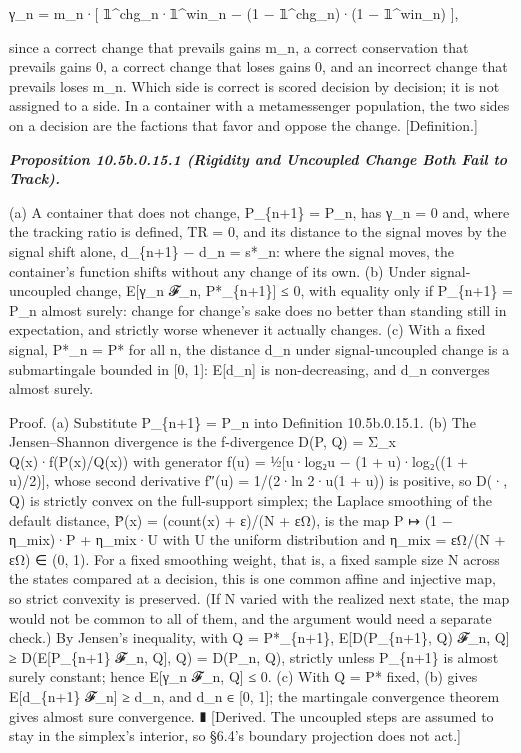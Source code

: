 \documentclass[
]{article}
\begin{document}
γ\_n = m\_n·{[} 𝟙\^{}chg\_n·𝟙\^{}win\_n − (1 − 𝟙\^{}chg\_n)·(1 −
𝟙\^{}win\_n) {]},

since a correct change that prevails gains m\_n, a correct conservation
that prevails gains 0, a correct change that loses gains 0, and an
incorrect change that prevails loses m\_n. Which side is correct is
scored decision by decision; it is not assigned to a side. In a
container with a metamessenger population, the two sides on a decision
are the factions that favor and oppose the change. {[}Definition.{]}

\emph{\textbf{Proposition 10.5b.0.15.1 (Rigidity and Uncoupled Change
Both Fail to Track).}}

(a) A container that does not change, P\_\{n+1\} = P\_n, has γ\_n = 0
and, where the tracking ratio is defined, TR = 0, and its distance to
the signal moves by the signal shift alone, d\_\{n+1\} − d\_n = s*\_n:
where the signal moves, the container's function shifts without any
change of its own. (b) Under signal-uncoupled change, E{[}γ\_n
\textbar{} 𝓕\_n, P*\_\{n+1\}{]} ≤ 0, with equality only if P\_\{n+1\} =
P\_n almost surely: change for change's sake does no better than
standing still in expectation, and strictly worse whenever it actually
changes. (c) With a fixed signal, P*\_n = P* for all n, the distance
d\_n under signal-uncoupled change is a submartingale bounded in {[}0,
1{]}: E{[}d\_n{]} is non-decreasing, and d\_n converges almost surely.

Proof. (a) Substitute P\_\{n+1\} = P\_n into Definition 10.5b.0.15.1.
(b) The Jensen--Shannon divergence is the f-divergence D(P, Q) = Σ\_x
Q(x)·f(P(x)/Q(x)) with generator f(u) = ½{[}u·log₂u − (1 + u)·log₂((1 +
u)/2){]}, whose second derivative f″(u) = 1/(2·ln 2·u(1 + u)) is
positive, so D(·, Q) is strictly convex on the full-support simplex; the
Laplace smoothing of the default distance, P̂(x) = (count(x) + ε)/(N +
εΩ), is the map P ↦ (1 − η\_mix)·P + η\_mix·U with U the uniform
distribution and η\_mix = εΩ/(N + εΩ) ∈ (0, 1). For a fixed smoothing
weight, that is, a fixed sample size N across the states compared at a
decision, this is one common affine and injective map, so strict
convexity is preserved. (If N varied with the realized next state, the
map would not be common to all of them, and the argument would need a
separate check.) By Jensen's inequality, with Q = P*\_\{n+1\},
E{[}D(P\_\{n+1\}, Q) \textbar{} 𝓕\_n, Q{]} ≥ D(E{[}P\_\{n+1\} \textbar{}
𝓕\_n, Q{]}, Q) = D(P\_n, Q), strictly unless P\_\{n+1\} is almost surely
constant; hence E{[}γ\_n \textbar{} 𝓕\_n, Q{]} ≤ 0. (c) With Q = P*
fixed, (b) gives E{[}d\_\{n+1\} \textbar{} 𝓕\_n{]} ≥ d\_n, and d\_n ∈
{[}0, 1{]}; the martingale convergence theorem gives almost sure
convergence. ∎ {[}Derived. The uncoupled steps are assumed to stay in
the simplex's interior, so §6.4's boundary projection does not act.{]}
\end{document}
